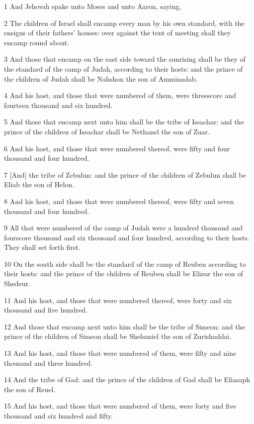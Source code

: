 \par 1 And Jehovah spake unto Moses and unto Aaron, saying,
\par 2 The children of Israel shall encamp every man by his own standard, with the ensigns of their fathers' houses: over against the tent of meeting shall they encamp round about.
\par 3 And those that encamp on the east side toward the sunrising shall be they of the standard of the camp of Judah, according to their hosts: and the prince of the children of Judah shall be Nahshon the son of Amminadab.
\par 4 And his host, and those that were numbered of them, were threescore and fourteen thousand and six hundred.
\par 5 And those that encamp next unto him shall be the tribe of Issachar: and the prince of the children of Issachar shall be Nethanel the son of Zuar.
\par 6 And his host, and those that were numbered thereof, were fifty and four thousand and four hundred.
\par 7 [And] the tribe of Zebulun: and the prince of the children of Zebulun shall be Eliab the son of Helon.
\par 8 And his host, and those that were numbered thereof, were fifty and seven thousand and four hundred.
\par 9 All that were numbered of the camp of Judah were a hundred thousand and fourscore thousand and six thousand and four hundred, according to their hosts. They shall set forth first.
\par 10 On the south side shall be the standard of the camp of Reuben according to their hosts: and the prince of the children of Reuben shall be Elizur the son of Shedeur.
\par 11 And his host, and those that were numbered thereof, were forty and six thousand and five hundred.
\par 12 And those that encamp next unto him shall be the tribe of Simeon: and the prince of the children of Simeon shall be Shelumiel the son of Zurishaddai.
\par 13 And his host, and those that were numbered of them, were fifty and nine thousand and three hundred.
\par 14 And the tribe of Gad: and the prince of the children of Gad shall be Eliasaph the son of Reuel.
\par 15 And his host, and those that were numbered of them, were forty and five thousand and six hundred and fifty.
